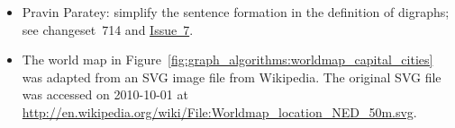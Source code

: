 \begin{itemize}
\item Pravin Paratey: simplify the sentence formation in the definition
  of digraphs; see changeset~714 and
  \href{http://code.google.com/p/graph-theory-algorithms-book/issues/detail?id=7}{Issue~7}.

\item The world map in
  Figure~\ref{fig:graph_algorithms:worldmap_capital_cities} was
  adapted from an SVG image file from Wikipedia. The original SVG file
  was accessed on 2010-10-01 at
  \url{http://en.wikipedia.org/wiki/File:Worldmap_location_NED_50m.svg}.
\end{itemize}
